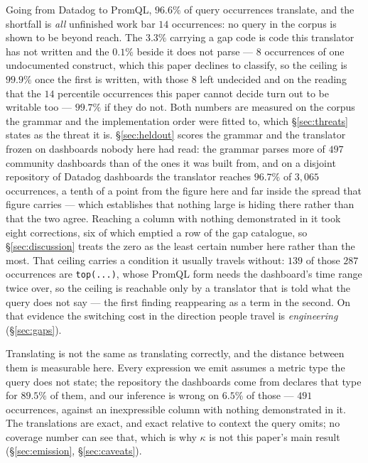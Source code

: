 Going from Datadog to PromQL, $96.6\%$ of query occurrences translate, and the shortfall
is \emph{all} unfinished work bar $14$ occurrences: no query in the corpus is shown to be beyond reach. The $3.3\%$
carrying a gap code is code this translator has not written and the $0.1\%$ beside it
does not parse --- $8$ occurrences of one undocumented construct, which this paper
declines to classify, so the ceiling is $99.9\%$ once the first is written, with those
$8$ left undecided and on the reading that the $14$ percentile occurrences this paper
cannot decide turn out to be writable too --- $99.7\%$ if they do not. Both numbers are measured on the corpus the grammar and the
implementation order were fitted to, which \S\ref{sec:threats} states as the threat it
is. \S\ref{sec:heldout} scores the grammar and the translator frozen on dashboards nobody
here had read: the grammar parses more of $497$ community dashboards than of the ones it
was built from, and on a disjoint repository of Datadog dashboards the translator reaches
$96.7\%$ of $3{,}065$ occurrences, a tenth of a point from the figure here and far
inside the spread that figure carries --- which establishes that nothing large is
hiding there rather than that the two agree. Reaching a column with nothing demonstrated in it took eight corrections, six of
which emptied a row of the gap catalogue, so
\S\ref{sec:discussion} treats the zero as the least certain number here rather than the
most. That ceiling carries a condition it usually travels without: $139$ of
those $287$ occurrences are \texttt{top(...)}, whose PromQL form needs the dashboard's
time range twice over, so the ceiling is reachable only by a translator that is told
what the query does not say --- the first finding reappearing as a term in the second.
On that evidence the switching cost in the direction people travel is
\emph{engineering} (\S\ref{sec:gaps}).

Translating is not the same as translating correctly, and the distance between them is
measurable here. Every expression we emit assumes a metric type the query does not
state; the repository the dashboards come from declares that type for $89.5\%$ of them,
and our inference is wrong on $6.5\%$ of those --- $491$ occurrences, against an
inexpressible column with nothing demonstrated in it. The translations are exact, and exact relative to context
the query omits; no coverage number can see that, which is why $\kappa$ is not this
paper's main result (\S\ref{sec:emission}, \S\ref{sec:caveats}).

